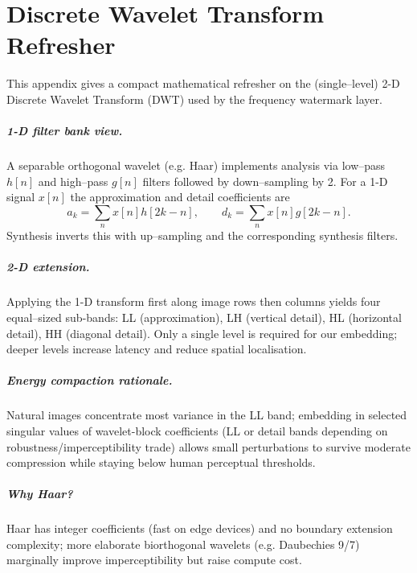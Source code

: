 \chapter{Discrete Wavelet Transform Refresher}\label{app:dwt}

This appendix gives a compact mathematical refresher on the (single–level) 2-D
Discrete Wavelet Transform (DWT) used by the frequency watermark layer.

\paragraph{1-D filter bank view.} A separable orthogonal wavelet (e.g. Haar)
implements analysis via low–pass $h[n]$ and high–pass $g[n]$ filters followed by
down–sampling by 2.
For a 1-D signal $x[n]$ the approximation and detail
coefficients are
\[
  a_k = \sum_n x[n] h[2k-n],\qquad d_k = \sum_n x[n] g[2k-n].
\]
Synthesis inverts this with up–sampling and the corresponding synthesis filters.

\paragraph{2-D extension.} Applying the 1-D transform first along image rows
then columns yields four equal–sized sub-bands: LL (approximation), LH (vertical
detail), HL (horizontal detail), HH (diagonal detail). Only a single level is
required for our embedding; deeper levels increase latency and reduce spatial
localisation.

\paragraph{Energy compaction rationale.} Natural images concentrate most
variance in the LL band; embedding in selected singular values of wavelet-block
coefficients (LL or detail bands depending on robustness/imperceptibility
trade) allows small perturbations to survive moderate compression while staying
below human perceptual thresholds.

\paragraph{Why Haar?} Haar has integer coefficients (fast on edge devices) and
no boundary extension complexity; more elaborate biorthogonal wavelets (e.g.
Daubechies 9/7) marginally improve imperceptibility but raise compute cost.

